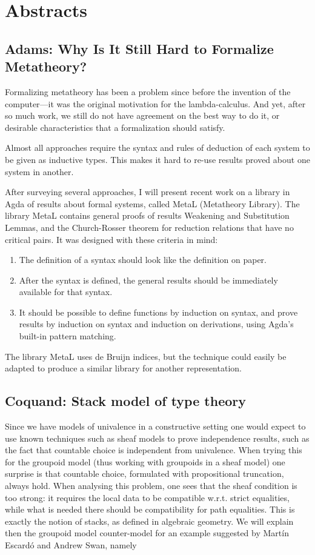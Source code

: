 \documentclass[a4paper,10pt]{scrartcl}
\begin{document}
\section*{Abstracts}

\subsection*{Adams: Why Is It Still Hard to Formalize Metatheory?}

Formalizing metatheory has been a problem since before the invention of the computer---it was the original motivation for the lambda-calculus.  
And yet, after so much work, we still do not have agreement on the best way to do it, or desirable characteristics that a formalization should satisfy.

Almost all approaches require the syntax and rules of deduction of each system to be given as inductive types.  
This makes it hard to re-use results proved about one system in another.

After surveying several approaches, I will present recent work on a library in Agda of results about formal systems, called MetaL (Metatheory Library).  
The library MetaL contains general proofs of results Weakening and Substitution Lemmas, and the Church-Rosser theorem for reduction relations that have no critical pairs.  
It was designed with these criteria in mind: 
\begin{enumerate}
 \item The definition of a syntax should look like the definition on paper.  
 \item After the syntax is defined, the general results should be immediately available for that syntax.  
 \item It should be possible to define functions by induction on syntax, and prove results by induction on syntax and induction on derivations, using Agda's built-in pattern matching.  
\end{enumerate}
 The library MetaL uses de Bruijn indices, but the technique could easily be adapted to produce a similar library for another representation.

\subsection*{Coquand: Stack model of type theory}

Since we have models of univalence in a constructive setting one would expect to use known techniques such as sheaf models to prove independence results, 
such as the fact that countable choice is independent from univalence. 
When trying this for the groupoid model (thus working with groupoids in a sheaf model) one surprise is that countable choice, formulated with propositional truncation, always hold. 
When analysing this problem, one sees that the sheaf condition is too strong: it requires the local data to be compatible w.r.t. strict equalities, 
while what is needed there should be compatibility for path equalities. This is exactly the notion of stacks, as defined in algebraic geometry. 
We will explain then the groupoid model counter-model for an example suggested by Martín Escardó and Andrew Swan, namely
\end{document}
